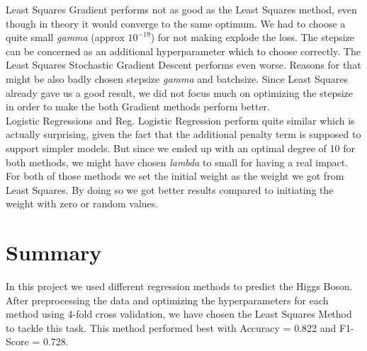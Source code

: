 \documentclass[10pt,conference,compsocconf]{IEEEtran}
\begin{document}
 
Least Squares Gradient performs not as good as the Least Squares method, even though in theory it would converge to the same optimum. We had to choose a quite small \textit{gamma} (approx $10^{-19}$) for not making explode the loss. The stepsize can be concerned as an additional hyperparameter which to choose correctly. The Least Squares Stochastic Gradient Descent performs even worse. Reasons for that might be also badly chosen stepsize \textit{gamma} and batchsize.
Since Least Squares already gave us a good result, we did not focus much on optimizing the stepsize in order to make the both Gradient methods perform better. \\
Logistic Regressions and Reg. Logistic Regression perform quite similar which is actually surprising, given the fact that the additional penalty term is supposed to support simpler models. But since we ended up with an optimal degree of 10 for both methods, we might have chosen \textit{lambda} to small for having a real impact. For both of those methods we set the initial weight as the weight we got from Least Squares. By doing so we got better results compared to initiating the weight with zero or random values. 


\section{Summary}

In this project we used different regression methods to predict the Higgs Boson. After preprocessing the data and optimizing the hyperparameters for each method using 4-fold cross validation, we have chosen the Least Squares Method to tackle this task. This method performed best with Accuracy = 0.822 and F1-Score = 0.728.



%
%
\end{document}
